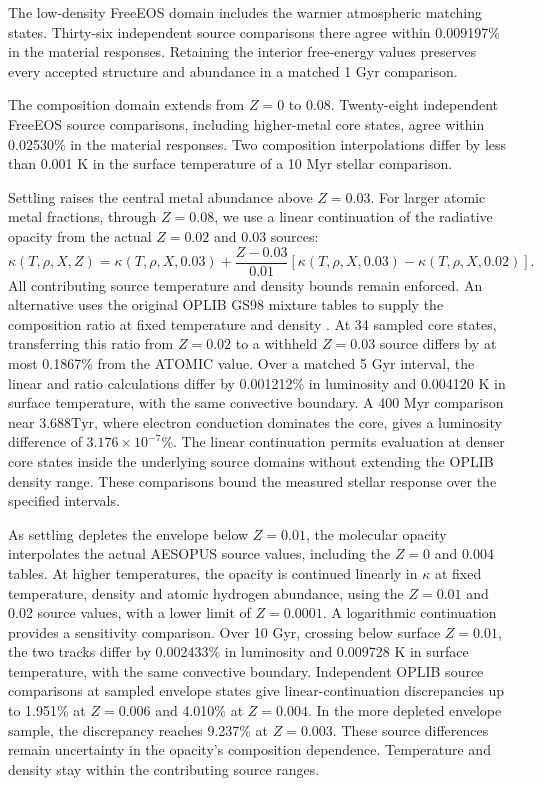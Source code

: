 \documentclass[11pt,letterpaper]{article}
\newcommand{\Tyr}{\mathrm{Tyr}}
\begin{document}
The low-density FreeEOS domain includes the warmer atmospheric matching
states. Thirty-six independent source comparisons there agree within
0.009197\% in the material responses. Retaining the interior free-energy
values preserves every accepted structure and abundance in a matched
1 Gyr comparison.

The composition domain extends from $Z=0$ to 0.08. Twenty-eight independent
FreeEOS source comparisons, including higher-metal core states, agree within
0.02530\% in the material responses. Two composition interpolations differ
by less than 0.001 K in the surface temperature of a 10 Myr stellar comparison.

Settling raises the central metal abundance above $Z=0.03$. For larger
atomic metal fractions, through $Z=0.08$, we use a linear continuation of
the radiative opacity from the actual $Z=0.02$ and 0.03 sources:
\begin{equation}
 \kappa(T,\rho,X,Z)=\kappa(T,\rho,X,0.03)
 +\frac{Z-0.03}{0.01}
 [\kappa(T,\rho,X,0.03)-\kappa(T,\rho,X,0.02)].
\end{equation}
All contributing source temperature and density bounds remain enforced.
An alternative uses the original OPLIB GS98 mixture tables to supply the
composition ratio at fixed temperature and density \cite{colgan16,farag24}.
At 34 sampled core states, transferring this ratio from $Z=0.02$ to a
withheld $Z=0.03$ source differs by at most 0.1867\% from the ATOMIC value.
Over a matched 5 Gyr interval, the linear and ratio calculations differ by
0.001212\% in luminosity and 0.004120 K in surface temperature, with the
same convective boundary. A 400 Myr comparison near $3.688\Tyr$, where
electron conduction dominates the core, gives a luminosity difference of
$3.176\times10^{-7}\%$. The linear continuation permits evaluation at
denser core states inside the underlying source domains without extending
the OPLIB density range. These comparisons bound the measured stellar
response over the specified intervals.


As settling depletes the envelope below $Z=0.01$, the molecular opacity
interpolates the actual AESOPUS source values, including the $Z=0$ and
0.004 tables. At higher temperatures, the opacity is continued linearly in
$\kappa$ at fixed temperature, density and atomic hydrogen abundance, using
the $Z=0.01$ and 0.02 source values, with a lower limit of $Z=0.0001$.
A logarithmic continuation provides a sensitivity comparison. Over 10 Gyr,
crossing below surface $Z=0.01$, the two tracks differ by 0.002433\% in
luminosity and 0.009728 K in surface temperature, with the same convective
boundary. Independent OPLIB source comparisons at sampled envelope states
give linear-continuation discrepancies up to 1.951\% at $Z=0.006$ and
4.010\% at $Z=0.004$. In the more depleted envelope sample, the discrepancy
reaches 9.237\% at $Z=0.003$. These source differences remain uncertainty
in the opacity's composition dependence. Temperature and density stay
within the contributing source ranges.
\end{document}

